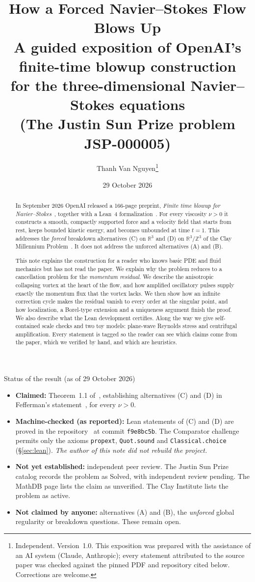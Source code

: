 \documentclass[11pt]{article}
\title{\textbf{How a Forced Navier--Stokes Flow Blows Up}\\[4pt]
\large A guided exposition of OpenAI's finite-time blowup construction\\
for the three-dimensional Navier--Stokes equations\\[2pt]
\normalsize (The Justin Sun Prize problem JSP-000005)}
\author{Thanh Van Nguyen\thanks{Independent. Version~1.0. This exposition was prepared with the assistance of an AI system (Claude, Anthropic); every statement attributed to the source paper was checked against the pinned PDF and repository cited below. Corrections are welcome.}}
\date{29 October 2026}
\newcommand{\R}{\mathbb{R}}
\theoremstyle{plain}
\theoremstyle{remark}
\begin{document}
\maketitle

\begin{abstract}
In September 2026 OpenAI released a 166-page preprint, \emph{Finite time blowup for Navier--Stokes}~\cite{OAI}, together with a Lean~4 formalization~\cite{OAILean}. For every viscosity $\nu>0$ it constructs a smooth, compactly supported force and a velocity field that starts from rest, keeps bounded kinetic energy, and becomes unbounded at time $t=1$. This addresses the \emph{forced} breakdown alternatives (C) on $\R^3$ and (D) on $\R^3/\mathbb Z^3$ of the Clay Millennium Problem~\cite{Fef}. It does not address the unforced alternatives (A) and (B).

This note explains the construction for a reader who knows basic PDE and fluid mechanics but has not read the paper. We explain why the problem reduces to a cancellation problem for the \emph{momentum residual}. We describe the anisotropic collapsing vortex at the heart of the flow, and how amplified oscillatory pulses supply exactly the momentum flux that the vortex lacks. We then show how an infinite correction cycle makes the residual vanish to every order at the singular point, and how localization, a Borel-type extension and a uniqueness argument finish the proof. We also describe what the Lean development certifies. Along the way we give self-contained scale checks and two toy models: plane-wave Reynolds stress and centrifugal amplification. Every statement is tagged so the reader can see which claims come from the paper, which we verified by hand, and which are heuristics.
\end{abstract}

\begin{statusbox}{Status of the result (as of 29 October 2026)}
\begin{itemize}[leftmargin=1.2em,itemsep=1pt]
\item \textbf{Claimed:} Theorem~1.1 of~\cite{OAI}, establishing alternatives (C) and (D) in Fefferman's statement~\cite{Fef}, for every $\nu>0$.
\item \textbf{Machine-checked (as reported):} Lean statements of (C) and (D) are proved in the repository~\cite{OAILean} at commit \texttt{f9e8bc5b}. The Comparator challenge permits only the axioms \texttt{propext}, \texttt{Quot.sound} and \texttt{Classical.choice} (\S\ref{sec:lean}). \emph{The author of this note did not rebuild the project.}
\item \textbf{Not yet established:} independent peer review. The Justin Sun Prize catalog records the problem as Solved, with independent review pending. The MathDB page lists the claim as unverified. The Clay Institute lists the problem as active.
\item \textbf{Not claimed by anyone:} alternatives (A) and (B), the \emph{unforced} global regularity or breakdown questions. These remain open.
\end{itemize}
\end{statusbox}
\end{document}
